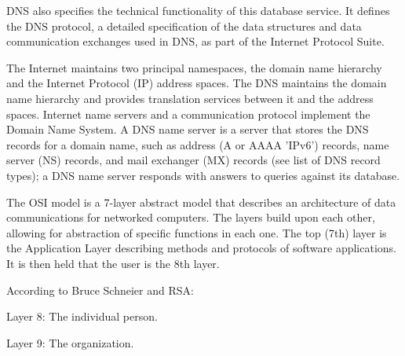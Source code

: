 \documentclass[9pt]{amsart}
\begin{document}
\begin{multicols}{2}
\noindent DNS also specifies the technical functionality of this database service. It defines the DNS protocol, a detailed specification of the data structures and data communication exchanges used in DNS, as part of the Internet Protocol Suite.

\noindent The Internet maintains two principal namespaces, the domain name hierarchy and the Internet Protocol (IP) address spaces. The DNS maintains the domain name hierarchy and provides translation services between it and the address spaces. Internet name servers and a communication protocol implement the Domain Name System. A DNS name server is a server that stores the DNS records for a domain name, such as address (A or AAAA 'IPv6') records, name server (NS) records, and mail exchanger (MX) records (see list of DNS record types); a DNS name server responds with answers to queries against its database.

\noindent {\textcolor {blue} {\em MAC Addresses}} 


\noindent {\textcolor {blue} {\em OSI}} 

The OSI model is a 7-layer abstract model that describes an architecture of data communications for networked computers. The layers build upon each other, allowing for abstraction of specific functions in each one. The top (7th) layer is the Application Layer describing methods and protocols of software applications. It is then held that the user is the 8th layer.

According to Bruce Schneier and RSA:

    Layer 8: The individual person.
    
    Layer 9: The organization.
    

\end{multicols}
\end{document}
